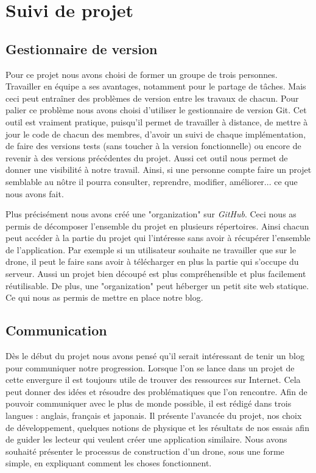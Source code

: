 \documentclass[a4paper,10pt]{report}
\begin{document}
  \appendix
    \chapter{Suivi de projet}
      \section{Gestionnaire de version}
	Pour ce projet nous avons choisi de former un groupe de trois 
personnes. Travailler en équipe a ses avantages, notamment pour le partage de 
tâches. Mais ceci peut entraîner des problèmes de version entre les travaux de 
chacun. Pour palier ce problème nous avons choisi d'utiliser le gestionnaire 
de version Git\cite{git}. Cet outil est vraiment pratique, puisqu'il permet de 
travailler à distance, de mettre à jour le code de chacun des membres, d'avoir 
un suivi de chaque implémentation, de faire des versions tests (sans toucher à 
la version fonctionnelle) ou encore de revenir à des versions précédentes du 
projet. Aussi cet outil nous permet de donner une visibilité à notre travail. 
Ainsi, si une personne compte faire un projet semblable au nôtre il pourra 
consulter, reprendre, modifier, améliorer... ce que nous avons fait.

	Plus précisément nous avons créé une "organization"\cite{njordgit} sur 
\textit{GitHub}\cite{github}. Ceci nous as permis de décomposer l'ensemble du 
projet en plusieurs répertoires. Ainsi chacun peut accéder à la partie du 
projet qui l'intéresse sans avoir à récupérer l'ensemble de l'application. Par 
exemple si un utilisateur souhaite ne travailler que sur le drone, il peut le 
faire sans avoir à télécharger en plus la partie qui s'occupe du serveur. Aussi 
un projet bien découpé est plus compréhensible et plus facilement réutilisable. 
De plus, une "organization" peut héberger un petit site web statique. Ce qui 
nous as permis de mettre en place notre blog\cite{njordblog}. 
	
      \section{Communication}
	Dès le début du projet nous avons pensé qu'il serait intéressant de 
tenir un blog pour communiquer notre progression. Lorsque l'on se lance dans un 
projet de cette envergure il est toujours utile de trouver des ressources sur 
Internet. Cela peut donner des idées et résoudre des problématiques que l'on 
rencontre. Afin de pouvoir communiquer avec le plus de monde possible, il est 
rédigé dans trois langues : anglais, français et japonais. Il présente 
l'avancée du projet, nos choix de développement, quelques notions de physique 
et les résultats de nos essais afin de guider les lecteur qui veulent créer une 
application similaire. Nous avons souhaité présenter le processus de 
construction d'un drone, sous une forme simple, en expliquant comment les 
choses fonctionnent.
\end{document}
